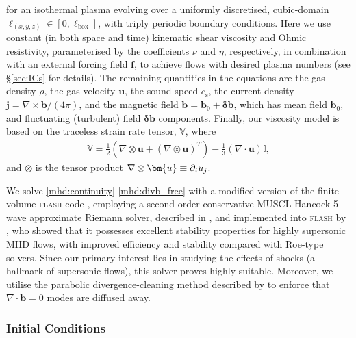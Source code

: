 \documentclass[12pt,twoside]{extreport}
\newcommand{\rbrac}[1]{\left( #1 \right)} %
\newcommand{\mVector}[1]{\bm{#1}} %
\newcommand{\mTensor}[1]{\mathbb{#1}} %
\newcommand{\mpp}[1]{\partial #1}
\begin{document}
for an isothermal plasma evolving over a uniformly discretised, cubic-domain $\ell_{(x, y, z)} \in [0, \ell_\mathrm{box}]$, with triply periodic boundary conditions. Here we use constant (in both space and time) kinematic shear viscosity and Ohmic resistivity, parameterised by the coefficients $\nu$ and $\eta$, respectively, in combination with an external forcing field $\mVector{f}$, to achieve flows with desired plasma numbers (see \S\ref{sec:ICs} for details). The remaining quantities in the equations are the gas density $\rho$, the gas velocity $\mVector{u}$, the sound speed $c_\mathrm{s}$, the current density $\mVector{j} = \nabla\times\mVector{b} /(4\pi)$, and the magnetic field $\mVector{b} = \mVector{b}_0 + \mVector{\delta b}$, which has mean field $\mVector{b}_0$, and fluctuating (turbulent) field $\mVector{\delta b}$ components. Finally, our viscosity model is based on the traceless strain rate tensor, $\mTensor{V}$, where
\begin{align}
    \mTensor{V}
        = \frac{1}{2} \rbrac{
                \nabla\otimes\mVector{u}
                + \rbrac{\nabla\otimes\mVector{u}}^T
            }
            - \frac{1}{3} \rbrac{\nabla\cdot\mVector{u}} \mTensor{I}
        , \label{eqn:strain_rate_tensor}
\end{align}
and $\otimes$ is the tensor product $\nabla\otimes\mVector{u} \equiv \mpp_i u_j$.

We solve \autoref{mhd:continuity}-\ref{mhd:divb_free} with a modified version of the finite-volume \textsc{flash} code \citep{fryxell2000flash, dubey2008introduction}, employing a second-order conservative MUSCL-Hancock 5-wave approximate Riemann solver, described in \citet{bouchut2007multiwave, bouchut2010multiwave}, and implemented into \textsc{flash} by \citet{waagan2011robust}, who showed that it possesses excellent stability properties for highly supersonic MHD flows, with improved efficiency and stability compared with Roe-type solvers. Since our primary interest lies in studying the effects of shocks (a hallmark of supersonic flows), this solver proves highly suitable. Moreover, we utilise the parabolic divergence-cleaning method described by \citet{Marder1987_fluxcleaning} to enforce that $\nabla\cdot\mVector{b} = 0$ modes are diffused away.

\subsubsection{Initial Conditions}
\end{document}

